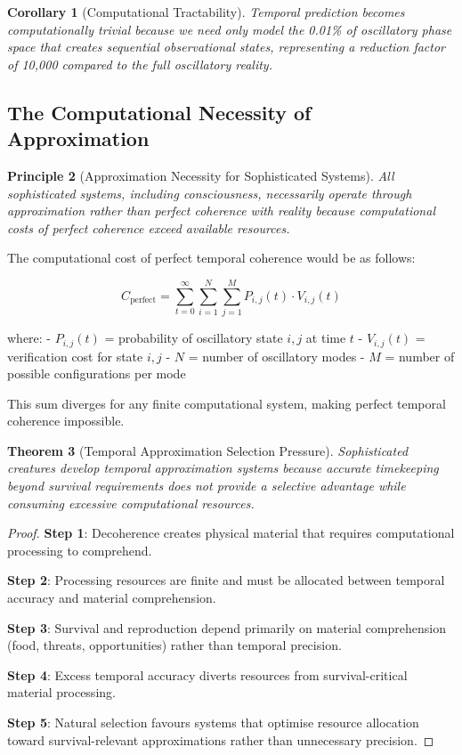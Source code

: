 \documentclass[11pt]{article}
\newtheorem{theorem}{Theorem}[section]
\newtheorem{corollary}[theorem]{Corollary}
\newtheorem{principle}[theorem]{Principle}
\theoremstyle{remark}
\begin{document}
\begin{corollary}[Computational Tractability]
Temporal prediction becomes computationally trivial because we need only model the 0.01\% of oscillatory phase space that creates sequential observational states, representing a reduction factor of 10,000 compared to the full oscillatory reality.
\end{corollary}

\subsection{The Computational Necessity of Approximation}

\begin{principle}[Approximation Necessity for Sophisticated Systems]
All sophisticated systems, including consciousness, necessarily operate through approximation rather than perfect coherence with reality because computational costs of perfect coherence exceed available resources.
\end{principle}

The computational cost of perfect temporal coherence would be as follows:

$$C_{\text{perfect}} = \sum_{t=0}^{\infty} \sum_{i=1}^{N} \sum_{j=1}^{M} P_{i,j}(t) \cdot V_{i,j}(t)$$

where:
- $P_{i,j}(t)$ = probability of oscillatory state $i,j$ at time $t$
- $V_{i,j}(t)$ = verification cost for state $i,j$
- $N$ = number of oscillatory modes
- $M$ = number of possible configurations per mode

This sum diverges for any finite computational system, making perfect temporal coherence impossible.

\begin{theorem}[Temporal Approximation Selection Pressure]
Sophisticated creatures develop temporal approximation systems because accurate timekeeping beyond survival requirements does not provide a selective advantage while consuming excessive computational resources.
\end{theorem}

\begin{proof}
\textbf{Step 1}: Decoherence creates physical material that requires computational processing to comprehend.

\textbf{Step 2}: Processing resources are finite and must be allocated between temporal accuracy and material comprehension.

\textbf{Step 3}: Survival and reproduction depend primarily on material comprehension (food, threats, opportunities) rather than temporal precision.

\textbf{Step 4}: Excess temporal accuracy diverts resources from survival-critical material processing.

\textbf{Step 5}: Natural selection favours systems that optimise resource allocation toward survival-relevant approximations rather than unnecessary precision.
\end{proof}
\end{document}
